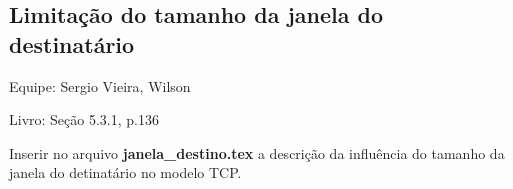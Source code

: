 
\subsection{Limitação do tamanho da janela do destinatário}
Equipe: Sergio Vieira, Wilson

Livro: Seção 5.3.1, p.136

Inserir no arquivo \textbf{janela\_destino.tex} a descrição da influência do tamanho da janela 
do detinatário no modelo TCP.


